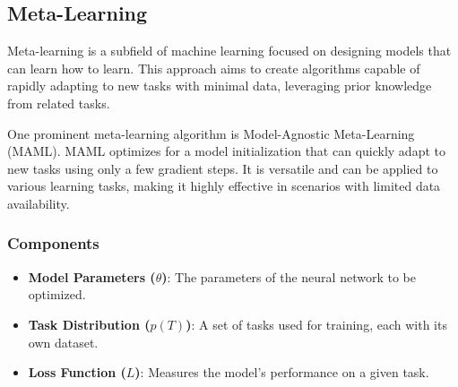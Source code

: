 \documentclass{ieeeojies}
\begin{document}
\subsection{Meta-Learning}
Meta-learning is a subfield of machine learning focused on designing models that can learn how to learn. This approach aims to create algorithms capable of rapidly adapting to new tasks with minimal data, leveraging prior knowledge from related tasks.

One prominent meta-learning algorithm is Model-Agnostic Meta-Learning (MAML). MAML optimizes for a model initialization that can quickly adapt to new tasks using only a few gradient steps. It is versatile and can be applied to various learning tasks, making it highly effective in scenarios with limited data availability.
\subsubsection*{\textbf{Components}}
\begin{itemize}
    \item \textbf{Model Parameters ($\theta$)}: The parameters of the neural network to be optimized.
    \item \textbf{Task Distribution ($p(T)$)}: A set of tasks used for training, each with its own dataset.
    \item \textbf{Loss Function ($L$)}: Measures the model's performance on a given task.
\end{itemize}
\end{document}
